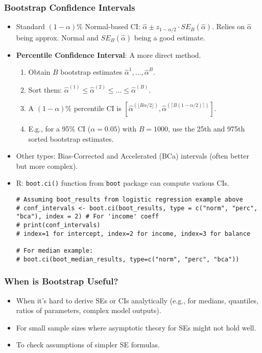 \documentclass[12pt,a4paper]{article}
\newcommand{\Rpackage}[1]{\texttt{#1}} %
\newcommand{\Rfunction}[1]{\texttt{#1()}} %
\begin{document}
\begin{itemize}
\begin{itemize}
\begin{itemize}
    \subsubsection{Bootstrap Confidence Intervals}
        \begin{itemize}
            \item Standard $(1-\alpha)\%$ Normal-based CI: $\hat{\alpha} \pm z_{1-\alpha/2} \cdot SE_B(\hat{\alpha})$. Relies on $\hat{\alpha}$ being approx. Normal and $SE_B(\hat{\alpha})$ being a good estimate.
            \item \textbf{Percentile Confidence Interval}: A more direct method.
                \begin{enumerate}
                    \item Obtain $B$ bootstrap estimates $\hat{\alpha}^{1}, \dots, \hat{\alpha}^{B}$.
                    \item Sort them: $\hat{\alpha}^{(1)} \le \hat{\alpha}^{(2)} \le \dots \le \hat{\alpha}^{(B)}$.
                    \item A $(1-\alpha)\%$ percentile CI is $[\hat{\alpha}^{(\lfloor B\alpha/2 \rfloor)}, \hat{\alpha}^{(\lceil B(1-\alpha/2) \rceil)}]$.
                    \item E.g., for a 95\% CI ($\alpha=0.05$) with $B=1000$, use the 25th and 975th sorted bootstrap estimates.
                \end{enumerate}
            \item Other types: Bias-Corrected and Accelerated (BCa) intervals (often better but more complex).
            \item R: \Rfunction{boot.ci} function from \Rpackage{boot} package can compute various CIs.
\begin{lstlisting}[caption={Bootstrap Confidence Intervals using boot.ci}]
# Assuming boot_results from logistic regression example above
# conf_intervals <- boot.ci(boot_results, type = c("norm", "perc", "bca"), index = 2) # For 'income' coeff
# print(conf_intervals)
# index=1 for intercept, index=2 for income, index=3 for balance

# For median example:
# boot.ci(boot_median_results, type=c("norm", "perc", "bca"))
\end{lstlisting}
        \end{itemize}

    \subsubsection{When is Bootstrap Useful?}
        \begin{itemize}
            \item When it's hard to derive SEs or CIs analytically (e.g., for medians, quantiles, ratios of parameters, complex model outputs).
            \item For small sample sizes where asymptotic theory for SEs might not hold well.
            \item To check assumptions of simpler SE formulas.
        \end{itemize}

\end{itemize}
\end{itemize}
\end{itemize}
\end{document}
